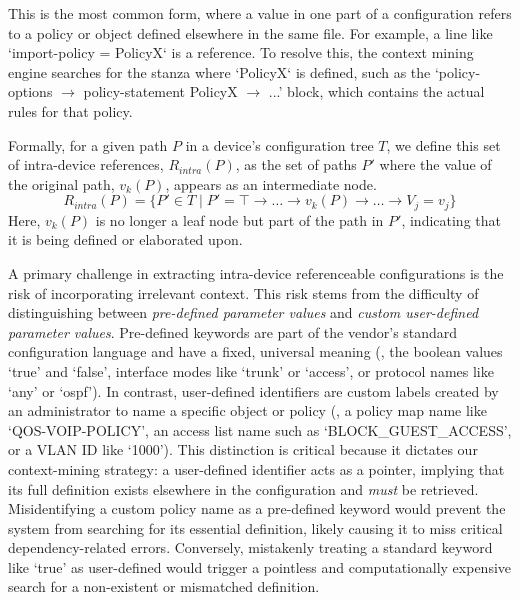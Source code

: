 This is the most common form, where a value in one part of a configuration refers to a policy or object defined elsewhere in the same file. For example, a line like `import-policy = PolicyX` is a reference. To resolve this, the context mining engine searches for the stanza where `PolicyX` is defined, such as the `policy-options $\rightarrow$ policy-statement PolicyX $\rightarrow$ ...' block, which contains the actual rules for that policy.

Formally, for a given path $P$ in a device's configuration tree $T$, we define this set of intra-device references, $R_{intra}(P)$, as the set of paths $P'$ where the value of the original path, $v_k(P)$, appears as an intermediate node.
\[
R_{intra}(P) = \{ P' \in T \mid P' =  \top \rightarrow \dots \rightarrow v_k(P) \rightarrow \dots \rightarrow V_j = v_j \}
\]
Here, $v_k(P)$ is no longer a leaf node but part of the path in $P'$, indicating that it is being defined or elaborated upon.



A primary challenge in extracting intra-device referenceable configurations is the risk of incorporating irrelevant context. This risk stems from the difficulty of distinguishing between \textit{pre-defined parameter values} and \textit{custom user-defined parameter values}.
Pre-defined keywords are part of the vendor's standard configuration language and have a fixed, universal meaning (\eg, the boolean values `true' and `false', interface modes like `trunk' or `access', or protocol names like `any' or `ospf'). In contrast, user-defined identifiers are custom labels created by an administrator to name a specific object or policy (\eg, a policy map name like `QOS-VOIP-POLICY', an access list name such as `BLOCK\_GUEST\_ACCESS', or a VLAN ID like `1000'). This distinction is critical because it dictates our context-mining strategy: a user-defined identifier acts as a pointer, implying that its full definition exists elsewhere in the configuration and \textit{must} be retrieved. 
Misidentifying a custom policy name as a pre-defined keyword would prevent the system from searching for its essential definition, likely causing it to miss critical dependency-related errors. Conversely, mistakenly treating a standard keyword like `true' as user-defined would trigger a pointless and computationally expensive search for a non-existent or mismatched definition.



